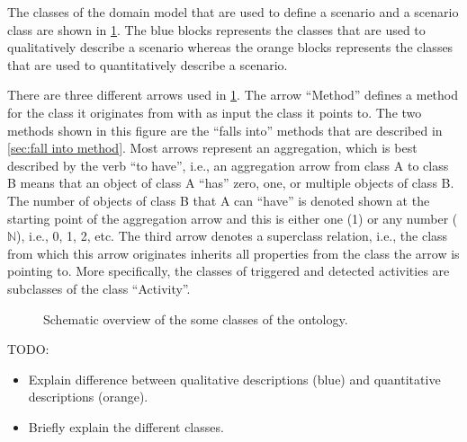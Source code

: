 The classes of the domain model that are used to define a scenario and a scenario class are shown in \cref{fig:ontology classes}. The blue blocks represents the classes that are used to qualitatively describe a scenario whereas the orange blocks represents the classes that are used to quantitatively describe a scenario. 

There are three different arrows used in \cref{fig:ontology classes}. The arrow ``Method'' defines a method for the class it originates from with as input the class it points to. The two methods shown in this figure are the ``falls into'' methods that are described in \cref{sec:fall into method}. Most arrows represent an aggregation, which is best described by the verb ``to have'', i.e., an aggregation arrow from class A to class B means that an object of class A ``has'' zero, one, or multiple objects of class B. The number of objects of class B that A can ``have'' is denoted shown at the starting point of the aggregation arrow and this is either one (1) or any number ($\mathbb{N}$), i.e., 0, 1, 2, etc. The third arrow denotes a superclass relation, i.e., the class from which this arrow originates inherits all properties from the class the arrow is pointing to. More specifically, the classes of triggered and detected activities are subclasses of the class ``Activity''.

\cbend
\begin{figure}
	\centering
	
	\caption{Schematic overview of the some classes of the ontology.}
	\label{fig:ontology classes}
\end{figure}
\cbstart


\color{red}
TODO: 
\begin{itemize}
	\item Explain difference between qualitative descriptions (blue) and quantitative descriptions (orange).
	\item Briefly explain the different classes.
\end{itemize}
\color{black}

\cbend